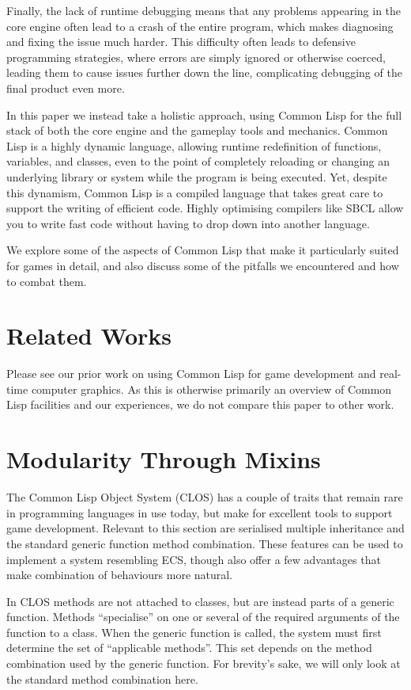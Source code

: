 \documentclass[a4paper]{paper}
\begin{document}
Finally, the lack of runtime debugging means that any problems appearing in the core engine often lead to a crash of the entire program, which makes diagnosing and fixing the issue much harder. This difficulty often leads to defensive programming strategies, where errors are simply ignored or otherwise coerced, leading them to cause issues further down the line, complicating debugging of the final product even more.

In this paper we instead take a holistic approach, using Common Lisp for the full stack of both the core engine and the gameplay tools and mechanics. Common Lisp is a highly dynamic language, allowing runtime redefinition of functions, variables, and classes, even to the point of completely reloading or changing an underlying library or system while the program is being executed. Yet, despite this dynamism, Common Lisp is a compiled language that takes great care to support the writing of efficient code. Highly optimising compilers like SBCL allow you to write fast code without having to drop down into another language.

We explore some of the aspects of Common Lisp that make it particularly suited for games in detail, and also discuss some of the pitfalls we encountered and how to combat them.

\section{Related Works}
Please see our prior work on using Common Lisp for game development and real-time computer graphics\cite{hafner2018shader}\cite{hafner2019shader}. As this is otherwise primarily an overview of Common Lisp facilities and our experiences, we do not compare this paper to other work.

\section{Modularity Through Mixins}
The Common Lisp Object System (CLOS) has a couple of traits that remain rare in programming languages in use today, but make for excellent tools to support game development. Relevant to this section are serialised multiple inheritance and the standard generic function method combination. These features can be used to implement a system resembling ECS, though also offer a few advantages that make combination of behaviours more natural.

In CLOS methods are not attached to classes, but are instead parts of a generic function. Methods ``specialise'' on one or several of the required arguments of the function to a class. When the generic function is called, the system must first determine the set of ``applicable methods''. This set depends on the method combination used by the generic function. For brevity's sake, we will only look at the standard method combination here.
\end{document}
